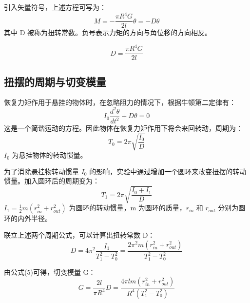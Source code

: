 \documentclass[12pt,a4paper]{article}
\begin{document}
	引入矢量符号，上述方程可写为：
	\begin{equation}
    M = -\frac{\pi R^4 G}{2l}\theta = -D\theta
	\end{equation}
	其中 D 被称为扭转常数。负号表示力矩的方向与角位移的方向相反。

	\begin{equation}
    D = \frac{\pi R^4 G}{2l}
	\end{equation}

	\subsection{扭摆的周期与切变模量}

	恢复力矩作用于悬挂的物体时，在忽略阻力的情况下，根据牛顿第二定律有：
	\begin{equation}
    I_0\frac{d^2\theta}{dt^2} + D\theta = 0
	\end{equation}
	这是一个简谐运动的方程。因此物体在恢复力矩作用下将会来回转动，周期为：
	\begin{equation}
    T_0 = 2\pi\sqrt{\frac{I_0}{D}}
	\end{equation}
	$I_0$ 为悬挂物体的转动惯量。

	为了消除悬挂物转动惯量 $I_0$ 的影响，实验中通过增加一个圆环来改变扭摆的转动惯量。加入圆环后的周期变为：
	\begin{equation}
    T_1 = 2\pi\sqrt{\frac{I_0 + I_1}{D}}
	\end{equation}
	$I_1 = \frac{1}{2}m(r_{in}^2 + r_{out}^2)$ 为圆环的转动惯量，m 为圆环的质量，$r_{in}$ 和 $r_{out}$ 分别为圆环的内外半径。

	联立上述两个周期公式，可以计算出扭转常数 D：
	\begin{equation}
    D = 4\pi^2\frac{I_1}{T_1^2 - T_0^2} = \frac{2\pi^2 m(r_{in}^2 + r_{out}^2)}{T_1^2 - T_0^2}
	\end{equation}

	由公式(5)可得，切变模量 G：
	\begin{equation}
    G = \frac{2l}{\pi R^4}D = \frac{4\pi lm(r_{in}^2 + r_{out}^2)}{R^4(T_1^2 - T_0^2)}
	\end{equation}
\end{document}
